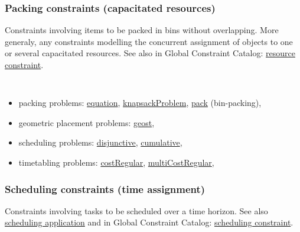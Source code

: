 \subsubsection{Packing constraints (capacitated resources)}\label{model:packingconstraints}\hypertarget{model:packingconstraints}{}
Constraints involving items to be packed in bins without overlapping. More generaly, any constraints modelling the concurrent assignment of objects to one or several capacitated resources.
See also in Global Constraint Catalog: \href{http://www.emn.fr/x-info/sdemasse/gccat/Kresource_constraint.html}{resource constraint}.

\vspace{1em}\noindent\begin{notedef}\tt
   \begin{itemize}
   \item packing problems: 
\hyperlink{equation:equationconstraint}{equation},
\hyperlink{knapsackproblem:knapsackproblemconstraint}{knapsackProblem},
\hyperlink{pack:packconstraint}{pack} (bin-packing),
   \item geometric placement problems: 
\hyperlink{geost:geostconstraint}{geost}, 
   \item scheduling problems: 
\hyperlink{disjunctive:disjunctiveconstraint}{disjunctive}, 
\hyperlink{cumulative:cumulativeconstraint}{cumulative}, 
   \item timetabling problems: 
\hyperlink{costregular:costregularconstraint}{costRegular},
\hyperlink{multicostregular:multicostregularconstraint}{multiCostRegular}, 
 \end{itemize}
\end{notedef}

\subsubsection{Scheduling constraints (time assignment)}\label{model:schedulingconstraints}\hypertarget{model:schedulingconstraints}{}
Constraints involving tasks to be scheduled over a time horizon.
See also \hyperlink{schedulinganduseofthecumulative:schedulinganduseofthecumulativeconstraint}{scheduling application} and in Global Constraint Catalog: \href{http://www.emn.fr/x-info/sdemasse/gccat/Kscheduling_constraint.html}{scheduling constraint}.

